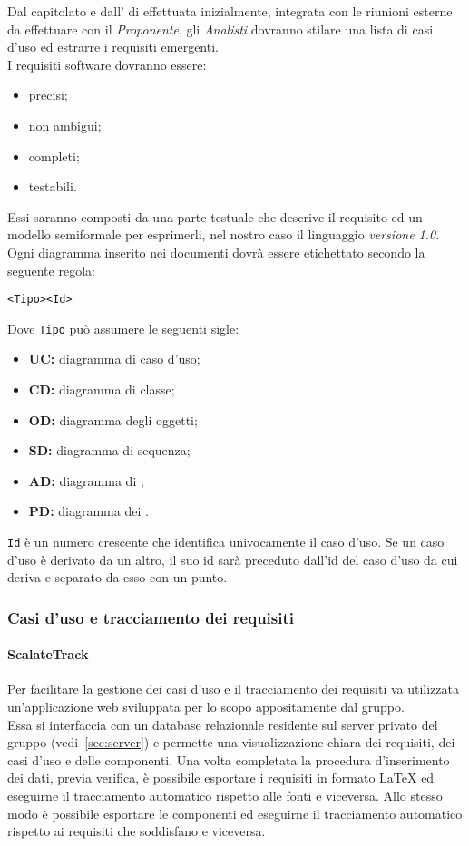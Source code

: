 \documentclass{scalatekids-article}
\begin{document}
Dal capitolato e dall' di  effettuata
inizialmente, integrata con le riunioni esterne da effettuare con il
\textit{Proponente}, gli \textit{Analisti} dovranno stilare una lista di casi
d'uso ed estrarre i requisiti emergenti.\\
I requisiti software dovranno essere:
\begin{itemize}
\item precisi;
\item non ambigui;
\item completi;
\item testabili.
\end{itemize}
Essi saranno composti da una parte testuale che descrive il requisito ed un
modello semiformale per esprimerli, nel nostro caso il linguaggio 
\textit{versione 1.0}. Ogni diagramma inserito nei documenti dovrà essere
etichettato secondo la seguente regola:
\begin{center}
  \verb=<Tipo><Id>=
\end{center}
Dove \verb=Tipo= può assumere le seguenti sigle:
\begin{itemize}
\item\textbf{UC:} diagramma di caso d'uso;
\item\textbf{CD:} diagramma di classe;
\item\textbf{OD:} diagramma degli oggetti;
\item\textbf{SD:} diagramma di sequenza;
\item\textbf{AD:} diagramma di ;
\item\textbf{PD:} diagramma dei .
\end{itemize}
\verb=Id= è un numero crescente che identifica
univocamente il caso d'uso. Se un caso d'uso è derivato da un altro, il suo id
sarà preceduto dall'id del caso d'uso da cui deriva e separato da esso con un
punto.

\subsubsection{Casi d'uso e tracciamento dei requisiti}

\label{sec:front-end}

\paragraph{ScalateTrack}
\label{sec:scalatetrack}

Per facilitare la gestione dei casi d'uso e il tracciamento dei requisiti va
utilizzata un'applicazione web sviluppata per lo scopo appositamente dal
gruppo.\\Essa si interfaccia con un database relazionale residente sul server
privato del gruppo (vedi~\ref{sec:server}) e permette una visualizzazione chiara
dei requisiti, dei casi d'uso e delle componenti. Una volta completata la
procedura d'inserimento dei dati, previa verifica, è possibile esportare i
requisiti in formato \LaTeX\xspace ed eseguirne il tracciamento automatico
rispetto alle fonti e viceversa. Allo stesso modo è possibile esportare le
componenti ed eseguirne il tracciamento automatico rispetto ai requisiti
che soddisfano e viceversa.
\end{document}
